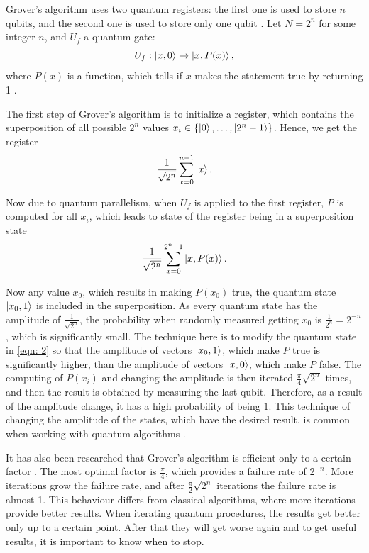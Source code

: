 \documentclass[english,oneside,openright]{UH_DS_report}
\begin{document}
Grover's algorithm uses two quantum registers: the first one is used to store $n$ qubits, and the second one is used to store only one qubit \cite{lavor2003grover}. Let $N = 2^{n}$ for some integer $n$, and $U_{f}$ a quantum gate:
\[U_{f} : \ket{x, 0} \rightarrow \ket{x, P(x)},\]
where $P(x)$ is a function, which tells if $x$ makes the statement true by returning 1 \cite{introtoqc}.

The first step of Grover's algorithm is to initialize a register, which contains the superposition of all possible $2^{n}$ values $x_{i} \in \{\ket{0}, \ldots, \ket{2^{n} - 1}\}$. Hence, we get the register
\begin{equation}
\label{eqn: 1}
    \frac{1}{\sqrt{2^{n}}}\sum_{x = 0}^{n - 1}\ket{x} .
\end{equation}

Now due to quantum parallelism, when $U_{f}$ is applied to the first register, $P$ is computed for all $x_{i}$, which leads to state of the register being in a superposition state
\begin{equation}
\label{eqn: 2}
\frac{1}{\sqrt{2^{n}}}\sum_{x = 0}^{2^{n} - 1}\ket{x, P(x)}.    
\end{equation}

Now any value $x_{0}$, which results in making $P(x_{0})$ true, the quantum state $\ket{x_{0}, 1}$ is included in the superposition. As every quantum state has the amplitude of $\frac{1}{\sqrt{2^{n}}}$, the probability when randomly measured getting $x_0$ is $\frac{1}{2^{n}} = 2^{-n}$, which is significantly small. The technique here is to modify the quantum state in \ref{eqn: 2} so that the amplitude of vectors $\ket{x_{0}, 1}$, which make $P$ true is significantly higher, than the amplitude of vectors $\ket{x, 0}$, which make $P$ false. The computing of $P(x_{i})$ and changing the amplitude is then iterated $\frac{\pi}{4} \sqrt{2^{n}}$ times, and then the result is obtained by measuring the last qubit. Therefore, as a result of the amplitude change, it has a high probability of being $1$. This technique of changing the amplitude of the states, which have the desired result, is common when working with quantum algorithms \cite{lavor2003grover}.

It has also been researched that Grover's algorithm is efficient only to a certain factor \cite{introtoqc}. The most optimal factor is $\frac{\pi}{4}$, which provides a failure rate of $2^{-n}$. More iterations grow the failure rate, and after $\frac{\pi}{2}\sqrt{2^{n}}$ iterations the failure rate is almost 1. This behaviour differs from classical algorithms, where more iterations provide better results. When iterating quantum procedures, the results get better only up to a certain point. After that they will get worse again and to get useful results, it is important to know when to stop.
\end{document}
